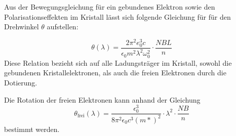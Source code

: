 Aus der Bewegungsgleichung für ein gebundenes Elektron sowie den Polarisationseffekten im Kristall lässt sich folgende Gleichung
für für den Drehwinkel $\theta$ aufstellen:

\begin{equation}
  \theta(\lambda)=\frac{2\pi^2e_0^3c}{\epsilon_0 m^2 \lambda^2 \omega_0^2}\cdot\frac{NBL}{n}
\end{equation}
Diese Relation bezieht sich auf alle Ladungsträger im Kristall, sowohl die gebundenen Kristallelektronen, als auch die
freien Elektronen durch die Dotierung.

Die Rotation der freien Elektronen kann anhand der Gleichung
\begin{equation}
  \theta_\text{frei}(\lambda)=\frac{\epsilon_0^3}{8\pi^2\epsilon_0c^3(m*)^2}\cdot\lambda^2\cdot\frac{NB}{n}
\end{equation}
bestimmt werden.
